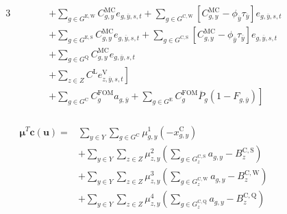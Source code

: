 \documentclass{article}
\newcommand{\sGeneratorsExisting}{G^{\mathrm{E}}}
\newcommand{\sGeneratorsExistingWind}{G^{\mathrm{E,W}}}
\newcommand{\sGeneratorsExistingSolar}{G^{\mathrm{E,S}}}
\newcommand{\sGeneratorsCandidate}{G^{\mathrm{C}}}
\newcommand{\sGeneratorsCandidateWind}{G^{\mathrm{C,W}}}
\newcommand{\sGeneratorsCandidateSolar}{G^{\mathrm{C,S}}}
\newcommand{\sStorage}{G^{\mathrm{Q}}}
\newcommand{\sStorageCandidate}{G^{\mathrm{C,Q}}}
\newcommand{\sYears}{Y}
\newcommand{\sZones}{Z}
\newcommand{\iGenerator}{g}
\newcommand{\iYear}{y}
\newcommand{\iYearTerminal}{\overline{\iYear}}
\newcommand{\iScenario}{s}
\newcommand{\iInterval}{t}
\newcommand{\iZone}{z}
\newcommand{\cFixedOperationsMaintenanceCostGenerator}[1][\iGenerator]{C^{\mathrm{FOM}}_{#1}}
\newcommand{\cMarginalCost}[1][\iGenerator,\iYear]{C^{\mathrm{MC}}_{#1}}
\newcommand{\cPowerOutputMax}[1][\iGenerator,\iYear]{\overline{P}_{#1}}
\newcommand{\cBuildLimitWind}{B^{\mathrm{C,\mathrm{W}}}_{\iZone}}
\newcommand{\cBuildLimitSolar}{B^{\mathrm{C,\mathrm{S}}}_{\iZone}}
\newcommand{\cBuildLimitStorage}{B^{\mathrm{C,\mathrm{Q}}}_{\iZone}}
\newcommand{\cLostLoadCost}{C^{\mathrm{L}}}
\newcommand{\cRetirementIndicator}[1][\iGenerator,\iYear]{F_{#1}}
\newcommand{\vBaseline}[1][\iYear]{\phi_{#1}}
\newcommand{\vPermitPrice}[1][\iYear]{\tau_{#1}}
\newcommand{\vEnergy}[1][\iGenerator,\iYear,\iScenario,\iInterval]{e_{#1}}
\newcommand{\vInstalledCapacity}[1][\iGenerator,\iYear]{x^{\mathrm{C}}_{#1}}
\newcommand{\vLostLoadEnergy}[1][\iZone,\iYear,\iScenario,\iInterval]{e^{\mathrm{V}}_{#1}}
\newcommand{\vInstalledCapacityTotal}[1][\iGenerator,\iYear]{a_{#1}}
\newcommand{\dNonNegativeCandidateCapacity}[1][\iGenerator,\iYear]{\mu_{#1}^{1}}
\newcommand{\dSolarBuildLimit}[1][\iZone,\iYear]{\mu_{#1}^{2}}
\newcommand{\dWindBuildLimit}[1][\iZone,\iYear]{\mu_{#1}^{3}}
\newcommand{\dStorageBuildLimit}[1][\iZone,\iYear]{\mu_{#1}^{4}}
\begin{document}
\begin{alignat}{3}
	& && && + \sum\limits_{\iGenerator \in \sGeneratorsExistingWind} \cMarginalCost \vEnergy[\iGenerator,\iYearTerminal,\iScenario,\iInterval] + \sum\limits_{\iGenerator \in \sGeneratorsCandidateWind} \left[\cMarginalCost - \vBaseline[\iYearTerminal] \vPermitPrice[\iYearTerminal]\right] \vEnergy[\iGenerator,\iYearTerminal,\iScenario,\iInterval] \nonumber\\
	& && && + \sum\limits_{\iGenerator \in \sGeneratorsExistingSolar} \cMarginalCost \vEnergy[\iGenerator,\iYearTerminal,\iScenario,\iInterval] + \sum\limits_{\iGenerator \in \sGeneratorsCandidateSolar} \left[\cMarginalCost - \vBaseline[\iYearTerminal]\vPermitPrice[\iYearTerminal]\right] \vEnergy[\iGenerator,\iYearTerminal,\iScenario,\iInterval] \nonumber\\
	& && && + \sum\limits_{\iGenerator \in \sStorage} \cMarginalCost \vEnergy[\iGenerator,\iYearTerminal,\iScenario,\iInterval] \nonumber\\
	& && && \left. + \sum\limits_{\iZone \in \sZones} \cLostLoadCost \vLostLoadEnergy[\iZone,\iYearTerminal,\iScenario,\iInterval] \right] \nonumber\\
	& && && \left. + \sum\limits_{\iGenerator \in \sGeneratorsCandidate} \cFixedOperationsMaintenanceCostGenerator \vInstalledCapacityTotal[\iGenerator,\iYearTerminal] + \sum\limits_{\iGenerator \in \sGeneratorsExisting} \cFixedOperationsMaintenanceCostGenerator \cPowerOutputMax[\iGenerator] \left(1 - \cRetirementIndicator[\iGenerator,\iYearTerminal]\right)\right]\\\nonumber
\end{alignat}

\begin{align}
\begin{split}
\bm{\mu}^{T}\bm{c}(\bm{u}) = & \sum\limits_{\iYear \in \sYears} \sum\limits_{\iGenerator \in \sGeneratorsCandidate} \dNonNegativeCandidateCapacity \left(-\vInstalledCapacity\right)\\
& + \sum\limits_{\iYear \in \sYears}\sum\limits_{\iZone \in \sZones} \dSolarBuildLimit \left(\sum\limits_{\iGenerator \in \sGeneratorsCandidateSolar_{\iZone}} \vInstalledCapacityTotal - \cBuildLimitSolar\right)\\
& + \sum\limits_{\iYear \in \sYears}\sum\limits_{\iZone \in \sZones} \dWindBuildLimit \left(\sum\limits_{\iGenerator \in \sGeneratorsCandidateWind_{\iZone}} \vInstalledCapacityTotal - \cBuildLimitWind\right)\\
& + \sum\limits_{\iYear \in \sYears}\sum\limits_{\iZone \in \sZones} \dStorageBuildLimit \left(\sum\limits_{\iGenerator \in \sStorageCandidate_{\iZone}} \vInstalledCapacityTotal - \cBuildLimitStorage\right)\\
\end{split}
\end{align}
\end{document}
